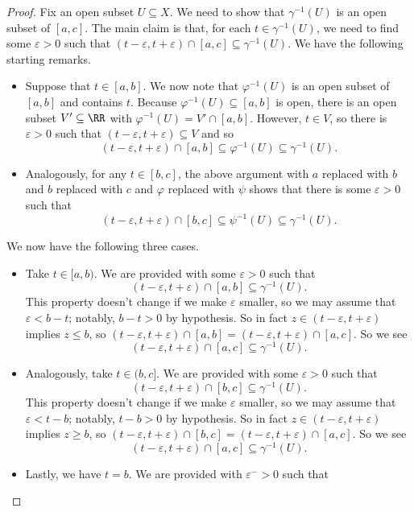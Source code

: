 \documentclass[../notes.tex]{subfiles}
\begin{document}
\begin{proof}
	Fix an open subset $U\subseteq X$. We need to show that $\gamma^{-1}(U)$ is an open subset of $[a,c]$. The main claim is that, for each $t\in\gamma^{-1}(U)$, we need to find some $\varepsilon>0$ such that $(t-\varepsilon,t+\varepsilon)\cap[a,c]\subseteq\gamma^{-1}(U)$. We have the following starting remarks.
	\begin{itemize}
		\item Suppose that $t\in[a,b]$. We now note that $\varphi^{-1}(U)$ is an open subset of $[a,b]$ and contains $t$. Because $\varphi^{-1}(U)\subseteq[a,b]$ is open, there is an open subset $V'\subseteq\RR$ with $\varphi^{-1}(U)=V'\cap[a,b]$. However, $t\in V$, so there is $\varepsilon>0$ such that $(t-\varepsilon,t+\varepsilon)\subseteq V$ and so
		\[(t-\varepsilon,t+\varepsilon)\cap[a,b]\subseteq\varphi^{-1}(U)\subseteq\gamma^{-1}(U).\]
		\item Analogously, for any $t\in[b,c]$, the above argument with $a$ replaced with $b$ and $b$ replaced with $c$ and $\varphi$ replaced with $\psi$ shows that there is some $\varepsilon>0$ such that
		\[(t-\varepsilon,t+\varepsilon)\cap[b,c]\subseteq\psi^{-1}(U)\subseteq\gamma^{-1}(U).\]
	\end{itemize}
	We now have the following three cases.
	\begin{itemize}
		\item Take $t\in[a,b)$. We are provided with some $\varepsilon>0$ such that
		\[(t-\varepsilon,t+\varepsilon)\cap[a,b]\subseteq\gamma^{-1}(U).\]
		This property doesn't change if we make $\varepsilon$ smaller, so we may assume that $\varepsilon<b-t$; notably, $b-t>0$ by hypothesis. So in fact $z\in(t-\varepsilon,t+\varepsilon)$ implies $z\le b$, so $(t-\varepsilon,t+\varepsilon)\cap[a,b]=(t-\varepsilon,t+\varepsilon)\cap[a,c]$. So we see
		\[(t-\varepsilon,t+\varepsilon)\cap[a,c]\subseteq\gamma^{-1}(U).\]
		\item Analogously, take $t\in(b,c]$. We are provided with some $\varepsilon>0$ such that
		\[(t-\varepsilon,t+\varepsilon)\cap[b,c]\subseteq\gamma^{-1}(U).\]
		This property doesn't change if we make $\varepsilon$ smaller, so we may assume that $\varepsilon<t-b$; notably, $t-b>0$ by hypothesis. So in fact $z\in(t-\varepsilon,t+\varepsilon)$ implies $z\ge b$, so $(t-\varepsilon,t+\varepsilon)\cap[b,c]=(t-\varepsilon,t+\varepsilon)\cap[a,c]$. So we see
		\[(t-\varepsilon,t+\varepsilon)\cap[a,c]\subseteq\gamma^{-1}(U).\]
		\item Lastly, we have $t=b$. We are provided with $\varepsilon^->0$ such that

\end{itemize}
\end{proof}
\end{document}
